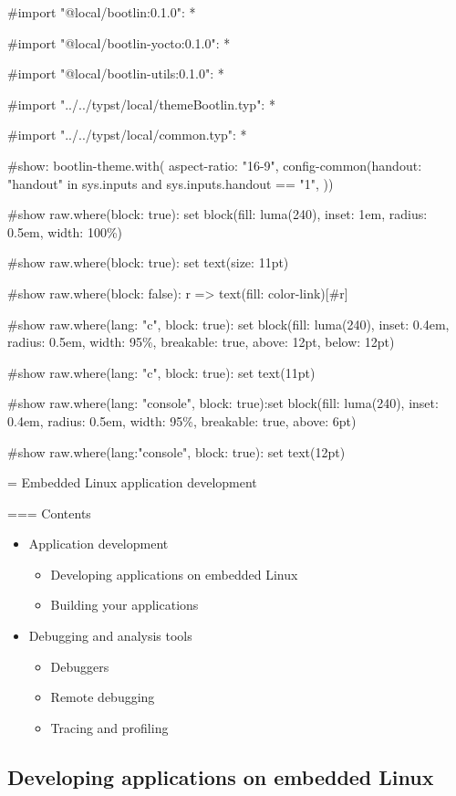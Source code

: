 #import "@local/bootlin:0.1.0": *

#import "@local/bootlin-yocto:0.1.0": *

#import "@local/bootlin-utils:0.1.0": *

#import "../../typst/local/themeBootlin.typ": *

#import "../../typst/local/common.typ": *

#show: bootlin-theme.with( aspect-ratio: "16-9", config-common(handout: "handout" in sys.inputs and sys.inputs.handout == "1", ))

#show raw.where(block: true): set block(fill: luma(240), inset: 1em, radius: 0.5em, width: 100\%)

#show raw.where(block: true): set text(size: 11pt)

#show raw.where(block: false): r => text(fill: color-link)[#r]

#show raw.where(lang: "c", block: true): set block(fill: luma(240), inset: 0.4em, radius: 0.5em, width: 95\%, breakable: true, above: 12pt, below: 12pt)

#show raw.where(lang: "c", block: true): set text(11pt)

#show raw.where(lang: "console", block: true):set block(fill: luma(240), inset: 0.4em, radius: 0.5em, width: 95\%, breakable: true, above: 6pt)

#show raw.where(lang:"console", block: true): set text(12pt)

 = Embedded Linux application development

=== {Contents}
  \begin{itemize}
  \item Application development
    \begin{itemize}
    \item Developing applications on embedded Linux
    \item Building your applications
    \end{itemize}
  \item Debugging and analysis tools
    \begin{itemize}
    \item Debuggers
    \item Remote debugging
    \item Tracing and profiling
    \end{itemize}
  \end{itemize}


\subsection{Developing applications on embedded Linux}

